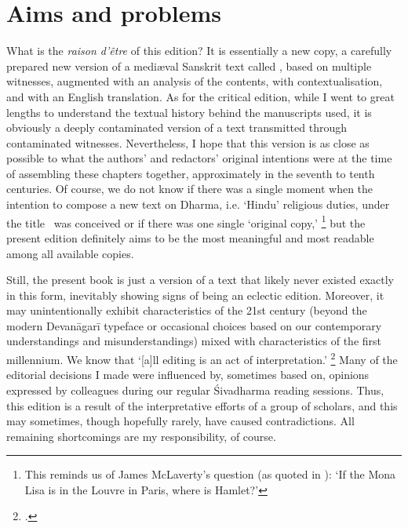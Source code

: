 

\section{Aims and problems}
\frenchspacing

\noindent
What is the \textit{raison d'\^etre} of this edition? 
It is essentially a new copy, a carefully prepared new version
of a medi\ae val Sanskrit text called \Vss, based on multiple witnesses,
augmented with an analysis of the contents, with
contextualisation, and with an English translation.
As for the critical edition, while I went to great 
lengths to understand the textual history behind 
the manuscripts used, it is obviously a deeply contaminated 
version of a text transmitted through contaminated witnesses.
Nevertheless, I hope that this version is as 
close as possible to what the authors' and redactors'
original intentions were at the time of assembling
these chapters together, approximately in the seventh to tenth centuries.
Of course, we do not know if there was a single moment
when the intention to compose a new text on Dharma,
i.e. `Hindu' religious duties, under the title \Vss\ was
conceived or if there was one single `original copy,'%
		\footnote{This reminds us of James McLaverty's
                  question (as quoted in
   				  ):
                 `If the Mona Lisa is in the Louvre in Paris, 	
                 where is Hamlet?'}
but the present edition definitely aims to be the most meaningful and
most readable among all available copies.

Still, the present book is just a
version of a text that likely never existed exactly 
in this form, inevitably showing
signs of being an eclectic edition. 
Moreover, it may unintentionally exhibit 
characteristics of the 21st century 
(beyond the modern Devanāgarī typeface
or occasional choices based on our contemporary
understandings and misunderstandings) 
mixed with characteristics of the first millennium.
We know that `[a]ll editing is an act of interpretation.'%
		\footnote{.}
Many of the editorial decisions I made were influenced by,
sometimes based on, opinions expressed by colleagues during our
regular Śivadharma reading sessions. Thus, this edition is a result
of the interpretative efforts of a group of scholars, and
this may sometimes, though hopefully rarely, have caused contradictions.
All remaining shortcomings are my responsibility, of course.

